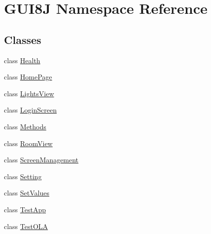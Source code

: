\hypertarget{namespaceGUI8J}{}\section{G\+U\+I8J Namespace Reference}
\label{namespaceGUI8J}
\subsection*{Classes}
\begin{DoxyCompactItemize}
\item 
class \hyperlink{classGUI8J_1_1Health}{Health}
\item 
class \hyperlink{classGUI8J_1_1HomePage}{Home\+Page}
\item 
class \hyperlink{classGUI8J_1_1LightsView}{Lights\+View}
\item 
class \hyperlink{classGUI8J_1_1LoginScreen}{Login\+Screen}
\item 
class \hyperlink{classGUI8J_1_1Methods}{Methods}
\item 
class \hyperlink{classGUI8J_1_1RoomView}{Room\+View}
\item 
class \hyperlink{classGUI8J_1_1ScreenManagement}{Screen\+Management}
\item 
class \hyperlink{classGUI8J_1_1Setting}{Setting}
\item 
class \hyperlink{classGUI8J_1_1SetValues}{Set\+Values}
\item 
class \hyperlink{classGUI8J_1_1TestApp}{Test\+App}
\item 
class \hyperlink{classGUI8J_1_1TestOLA}{Test\+O\+LA}
\end{DoxyCompactItemize}
